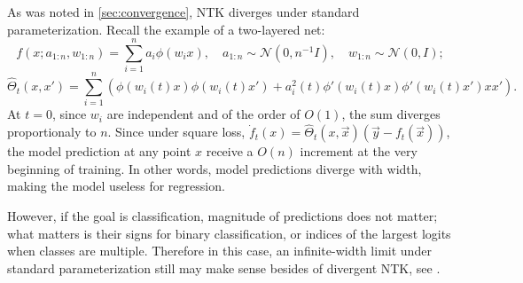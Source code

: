 \documentclass{article}
\newcommand{\EE}{\mathbb{E}\,}
\newcommand{\NN}{\mathcal{N}}
\begin{document}
    As was noted in \cref{sec:convergence}, NTK diverges under standard parameterization.
    Recall the example of a two-layered net:
    \begin{equation}
        f(x; a_{1:n}, w_{1:n})
        = \sum_{i=1}^n a_i \phi(w_i x),
        \quad
        a_{1:n} \sim \NN(0, n^{-1} I),
        \quad
        w_{1:n} \sim \NN(0, I);
    \end{equation}
    \begin{equation}
        \hat\Theta_t(x,x')
        = \sum_{i=1}^n \left(\phi(w_i(t) x) \phi(w_i(t) x') + a_i^2(t) \phi'(w_i(t) x) \phi'(w_i(t) x') x x'\right).
    \end{equation}
    At $t=0$, since $w_i$ are independent and of the order of $O(1)$, the sum diverges proportionaly to $n$.
    Since under square loss, $\dot f_t(x) = \hat\Theta_t(x,\vec x) (\vec y - f_t(\vec x))$, the model prediction at any point $x$ receive a $O(n)$ increment at the very beginning of training.
    In other words, model predictions diverge with width, making the model useless for regression.

    However, if the goal is classification, magnitude of predictions does not matter; what matters is their signs for binary classification, or indices of the largest logits when classes are multiple.
    Therefore in this case, an infinite-width limit under standard parameterization still may make sense besides of divergent NTK, see \cite{golikov2020dynamically}.
\end{document}
